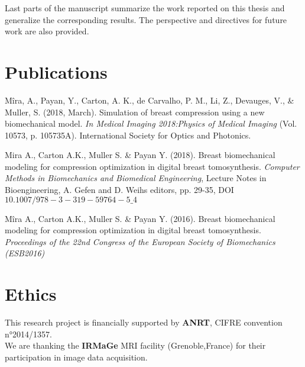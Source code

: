 Last parts of the manuscript summarize the work reported on this thesis and generalize the corresponding results. The perspective and directives for future work are also provided.  

\cleardoublepage  
\chapter*{Publications}\label{section:publications}
\begin{description}

\item  Mîra, A., Payan, Y., Carton, A. K., de Carvalho, P. M., Li, Z., Devauges, V., \& Muller, S. (2018, March). Simulation of breast compression using a new biomechanical model. \textit {In Medical Imaging 2018:Physics of Medical Imaging} (Vol. 10573, p. 105735A). International Society for Optics and Photonics. \\

\item  Mira A., Carton A.K., Muller S. \& Payan Y. (2018). Breast biomechanical modeling for compression optimization in digital breast tomosynthesis. \textit{Computer Methods in Biomechanics and Biomedical Engineering}, Lecture Notes in Bioengineering, A. Gefen and D. Weihs editors, pp. 29-35, DOI $10.1007/978-3-319-59764-5\_4$ \\

\item  Mîra A., Carton A.K., Muller S. \& Payan Y. (2016). Breast biomechanical modeling for compression optimization in digital breast tomosynthesis. \textit{Proceedings of the 22nd Congress of the European Society of Biomechanics (ESB2016)}
\end{description}

\cleardoublepage
\chapter*{Ethics}\label{section:ethics}

This research project is financially supported by \textbf{ANRT}, CIFRE convention n°2014/1357.
\\

\noindent We are thanking the \textbf{IRMaGe} MRI facility (Grenoble,France) for their participation in image data acquisition. 

\cleardoublepage